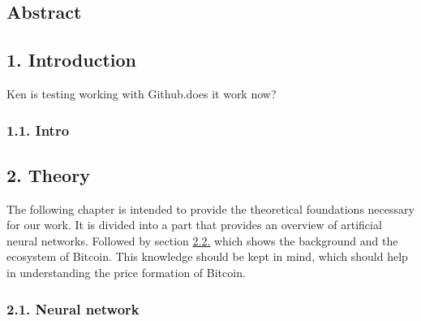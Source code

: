 \documentclass[
]{article}
\author{}
\date{\vspace{-2.5em}}
\begin{document}




\setcounter{tocdepth}{4}
\tableofcontents

\newpage

\hypertarget{abstract}{%
\subsection{Abstract}\label{abstract}}

\newpage


\hypertarget{introduction}{%
\subsection{1. Introduction}\label{introduction}}

Ken is testing working with Github.does it work now?

\hypertarget{intro}{%
\subsubsection{1.1. Intro}\label{intro}}

\newpage

\hypertarget{theory}{%
\subsection{2. Theory}\label{theory}}

The following chapter is intended to provide the theoretical foundations
necessary for our work. It is divided into a part that provides an
overview of artificial neural networks. Followed by section
\protect\hyperlink{bitcoin}{2.2.} which shows the background and the
ecosystem of Bitcoin. This knowledge should be kept in mind, which
should help in understanding the price formation of Bitcoin.

\hypertarget{neural_network}{%
\subsubsection{2.1. Neural network}\label{neural_network}}
\end{document}

